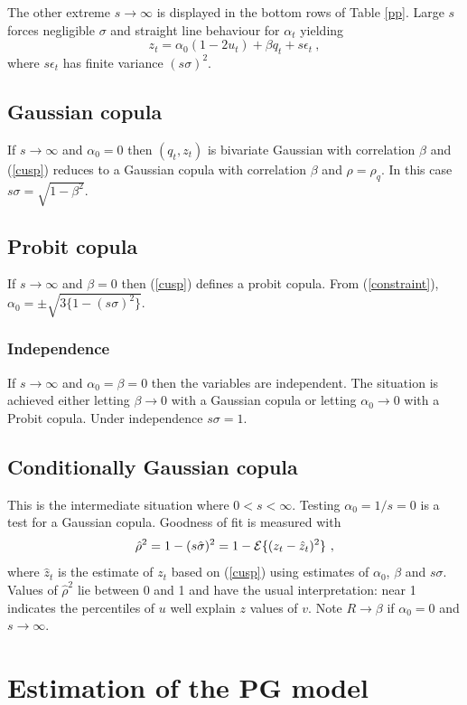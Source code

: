 \documentclass[authoryear]{elsarticle}
\newcommand{\eps}{\epsilon}
\newcommand{\Ex}{{\cal E}}
\newcommand{\eref}[1]{(\ref{#1})}
\newcommand{\tref}[1]{Table \ref{#1}}
\newcommand{\be}[1]{\begin{equation}\label{#1}}
\newcommand{\ee}{\end{equation}}
\begin{document}
The other  extreme  $s\rightarrow\infty$ is displayed  in the bottom rows of \tref{pp}.  Large $s$ forces negligible $\sigma$  and straight line behaviour for $\alpha_t$ yielding
$$
z_t= \alpha_0(1-2u_t) + \beta q_t + s\eps_t\ ,
$$
where $s\eps_t$ has finite variance $(s\sigma)^2$.     

\subsection{Gaussian copula}
If $s\rightarrow\infty$ and  $\alpha_0=0$ then $(q_t,z_t)$ is bivariate   Gaussian with correlation $\beta$ and \eref{cusp} reduces to a Gaussian copula with correlation $\beta$ and $\rho=\rho_q$.  In this case $s\sigma=\sqrt{1-\beta^2}$. 

\subsection{Probit copula}


 If $s\rightarrow\infty$ and  $\beta=0$ then \eref{cusp} defines a probit copula.   From \eref{constraint}, $\alpha_0=\pm\sqrt{ 3\{1-(s\sigma)^2\}}$. 
 
 \subsubsection{Independence}
 If $s\rightarrow\infty$ and  $\alpha_0=\beta=0$ then the variables are independent.   The situation is achieved either letting $\beta\rightarrow 0$ with a Gaussian copula or letting $\alpha_0\rightarrow 0$ with a Probit copula.  Under independence $s\sigma=1$.  
 
 \subsection{Conditionally Gaussian copula}  

This is the intermediate situation where  $0<s<\infty$.  Testing $\alpha_0=1/s=0$ is a test for a Gaussian copula.   Goodness of fit is measured with 
\be{R2}
\hat\rho^2= 1-(s\hat\sigma)^2=1-\Ex\{(z_t-\hat z_t)^2\}\ ,
\ee
where  $\hat z_t$ is the estimate of $z_t$ based on \eref{cusp} using estimates of $\alpha_0$, $\beta$ and $s\sigma$.  
Values of $\hat\rho^2$ lie between 0 and 1 and have the usual interpretation:    near 1 indicates the percentiles of $u$ well explain $z$ values of $v$.   
Note $R\rightarrow\beta$  if $\alpha_0=0$ and $s\rightarrow \infty$.

\section{Estimation of the PG model}
\end{document}
